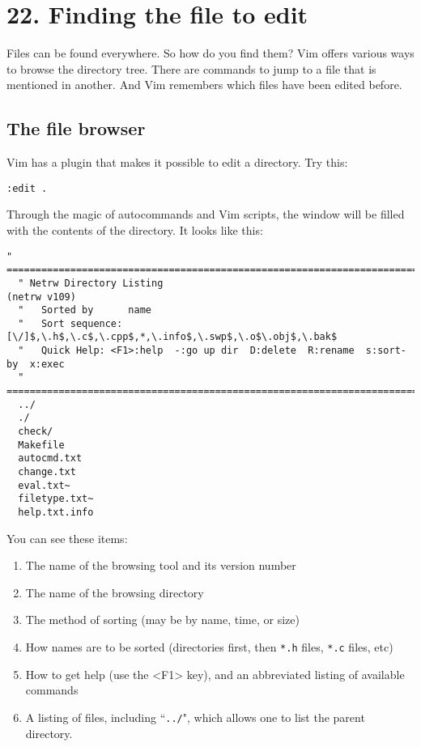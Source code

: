 \section{22. Finding the file to edit}
Files can be found everywhere.  So how do you find them?  Vim offers various
ways to browse the directory tree.  There are commands to jump to a file that
is mentioned in another.  And Vim remembers which files have been edited
before.
\localtableofcontents
\subsection{The file browser}

Vim has a plugin that makes it possible to edit a directory.  Try this:

\begin{Verbatim}[samepage=true]
 :edit .
\end{Verbatim}

Through the magic of autocommands and Vim scripts, the window will be filled with the contents of the directory.
It looks like this:

\begin{Verbatim}[samepage=true]
  " ============================================================================
  " Netrw Directory Listing                                        (netrw v109)
  "   Sorted by      name
  "   Sort sequence: [\/]$,\.h$,\.c$,\.cpp$,*,\.info$,\.swp$,\.o$\.obj$,\.bak$
  "   Quick Help: <F1>:help  -:go up dir  D:delete  R:rename  s:sort-by  x:exec
  " ============================================================================
  ../
  ./
  check/
  Makefile
  autocmd.txt
  change.txt
  eval.txt~
  filetype.txt~
  help.txt.info
\end{Verbatim}

You can see these items:

\begin{enumerate}
\item The name of the browsing tool and its version number
\item The name of the browsing directory
\item The method of sorting (may be by name, time, or size)
\item How names are to be sorted (directories first, then \texttt{*.h} files, \texttt{*.c} files, etc)
\item How to get help (use the <F1> key), and an abbreviated listing of available commands
\item A listing of files, including ``\texttt{../}", which allows one to list the parent directory.
\end{enumerate}

